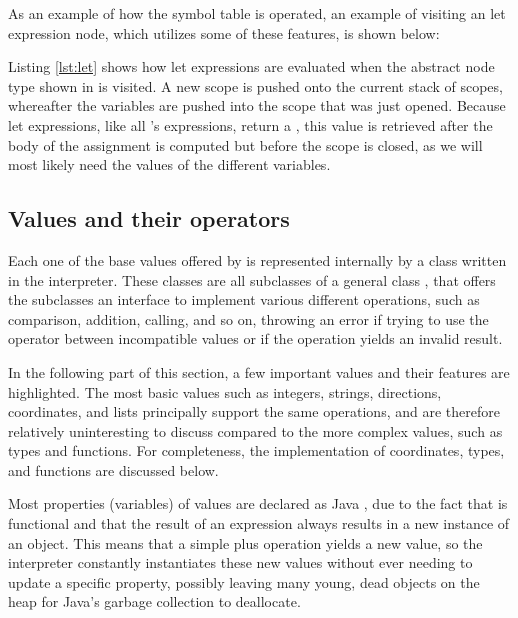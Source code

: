 As an example of how the symbol table is operated, an example of
visiting an let expression node, which utilizes some of these
features, is shown below:



Listing \ref{lst:let} shows how let expressions are evaluated
when the abstract node type shown in  is
visited. A new scope is pushed onto the current stack of scopes,
whereafter the variables are pushed into the scope that was
just opened. Because let expressions, like all \productname{}'s
expressions, return a , this value is retrieved after
the body of the assignment is computed but before the scope is closed,
as we will most likely need the values of the different variables.

\subsection{Values and their operators}
\label{sec:valuesandtheiroperators}
Each one of the base values offered by \productname{} is represented
internally by a class written in the interpreter. These classes are
all subclasses of a general class , that offers the
subclasses an interface to implement various different operations, such
as comparison, addition, calling, and so on, throwing an error if trying
to use the operator between incompatible values or if the operation
yields an invalid result.

In the following part of this section, a few important values and their
features are highlighted. The most basic values such as integers,
strings, directions, coordinates, and lists principally support the
same operations, and are therefore relatively uninteresting to discuss
compared to the more complex values, such as types and functions. For
completeness, the implementation of coordinates, types, and
functions are discussed below.

Most properties (variables) of values are declared as Java
, due to the fact that \productname{} is functional and
that the result of an expression always results in a new instance of an
object. This means that a simple plus operation yields a new value, so
the interpreter constantly instantiates these new values without ever
needing to update a specific property, possibly leaving many young, dead
objects on the heap for Java's garbage collection to deallocate.

